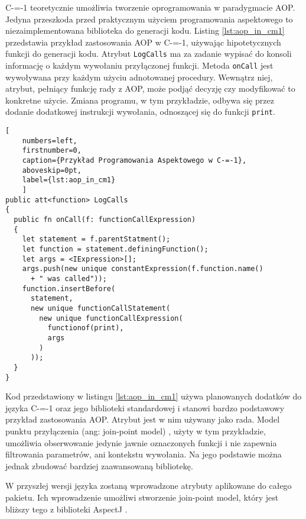 C-=-1 teoretycznie umożliwia tworzenie oprogramowania w paradygmacie AOP.
Jedyna przeszkoda przed praktycznym użyciem programowania aspektowego to niezaimplementowana biblioteka do generacji kodu.
Listing \ref{lst:aop_in_cm1} przedstawia przykład zastosowania AOP w C-=-1, używając hipotetycznych funkcji do generacji kodu.
Atrybut \lstinline{LogCalls} ma za zadanie wypisać do konsoli informację o każdym wywołaniu przyłączonej funkcji.
Metoda \lstinline{onCall} jest wywoływana przy każdym użyciu adnotowanej procedury.
Wewnątrz niej, atrybut, pełniący funkcję rady z AOP, może podjąć decyzję czy modyfikować to konkretne użycie.
Zmiana programu, w tym przykładzie, odbywa się przez dodanie dodatkowej instrukcji wywołania, odnoszącej się do funkcji \lstinline{print}.

\begin{minipage}{\linewidth}
  
  \begin{lstlisting}[
    numbers=left,
    firstnumber=0,
    caption={Przykład Programowania Aspektowego w C-=-1},
    aboveskip=0pt,
    label={lst:aop_in_cm1}
    ]
public att<function> LogCalls
{
  public fn onCall(f: functionCallExpression)
  {
    let statement = f.parentStatment();
    let function = statement.definingFunction();
    let args = <IExpression>[];
    args.push(new unique constantExpression(f.function.name()
      + " was called"));
    function.insertBefore(
      statement,
      new unique functionCallStatement(
        new unique functionCallExpression(
          functionof(print),
          args
        )
      ));
  }
}
\end{lstlisting}
\end{minipage}

Kod przedstawiony w listingu \ref{lst:aop_in_cm1} używa planowanych dodatków do języka C-=-1 oraz jego biblioteki standardowej i stanowi bardzo podstawowy przykład zastosowania AOP.
Atrybut jest w nim używany jako rada.
Model punktu przyłączenia (ang: join-point model) \cite{vidal2019jpiaspectz}, użyty w tym przykładzie, umożliwia obserwowanie jedynie jawnie oznaczonych funkcji i nie zapewnia filtrowania parametrów, ani kontekstu wywołania.
Na jego podstawie można jednak zbudować bardziej zaawansowaną bibliotekę.

W przyszłej wersji języka zostaną wprowadzone atrybuty aplikowane do całego pakietu.
Ich wprowadzenie umożliwi stworzenie join-point model, który jest bliższy tego z biblioteki AspectJ \cite{keselev2003aspect}.


